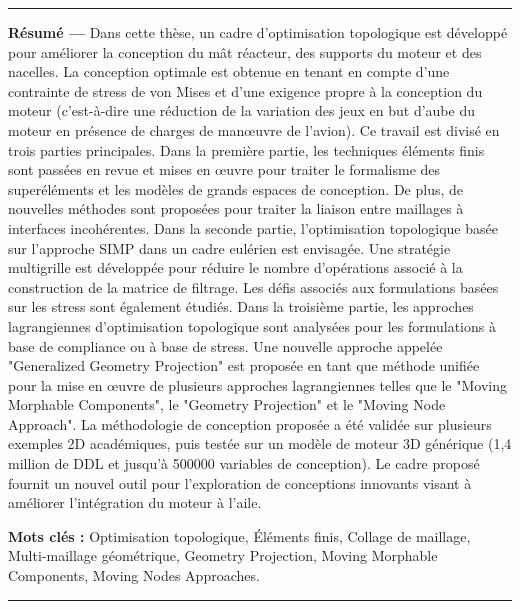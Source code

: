 \begin{vcenterpage}

\noindent\rule[2pt]{\textwidth}{0.5pt}

{\large\textbf{Résumé ---}}
    Dans cette thèse, un cadre d'optimisation topologique est développé pour améliorer la conception du mât réacteur, des supports du moteur et des nacelles. La conception optimale est obtenue en tenant en compte d’une contrainte de stress de von Mises et d’une exigence propre à la conception du moteur (c’est-à-dire une réduction de la variation des jeux en but d'aube du moteur en présence de charges de manœuvre de l’avion). Ce travail est divisé en trois parties principales. Dans la première partie, les techniques éléments finis sont passées en revue et mises en œuvre pour traiter le formalisme des superéléments et les modèles de grands espaces de conception. De plus, de nouvelles méthodes sont proposées pour traiter la liaison entre maillages à interfaces incohérentes. Dans la seconde partie, l'optimisation topologique basée sur l'approche SIMP dans un cadre eulérien est envisagée. Une stratégie multigrille est développée pour réduire le nombre d'opérations associé à la construction de la matrice de filtrage. Les défis associés aux formulations basées sur les stress sont également étudiés. Dans la troisième partie, les approches lagrangiennes d’optimisation topologique sont analysées pour les formulations à base de compliance ou à base de stress. Une nouvelle approche appelée "Generalized Geometry Projection" est proposée en tant que méthode unifiée pour la mise en œuvre de plusieurs approches lagrangiennes telles que le "Moving Morphable Components", le "Geometry Projection" et le "Moving Node Approach". La méthodologie de conception proposée a été validée sur plusieurs exemples 2D académiques, puis testée sur un modèle de moteur 3D générique (1,4 million de DDL et jusqu'à 500000 variables de conception). Le cadre proposé fournit un nouvel outil pour l’exploration de conceptions innovants visant à améliorer l’intégration du moteur à l’aile.
    
    
    

{\large\textbf{Mots clés :}}
   Optimisation topologique, Éléments finis, Collage de maillage, Multi-maillage géométrique, Geometry Projection, Moving Morphable Components, Moving Nodes Approaches.
\\
\noindent\rule[2pt]{\textwidth}{0.5pt}
\end{vcenterpage}
\newpage
